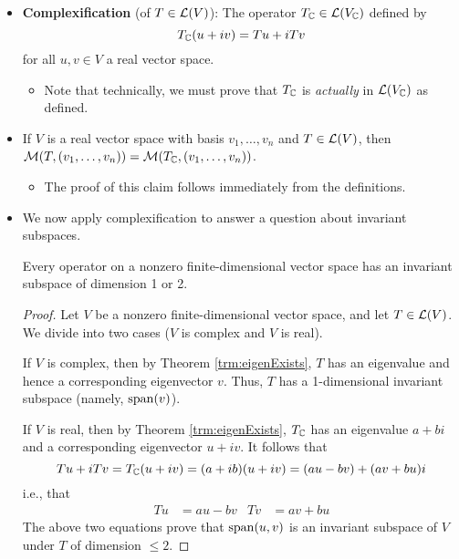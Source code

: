 \documentclass[../main.tex]{subfiles}
\begin{document}
\begin{itemize}
    \item \textbf{Complexification} (of $T\in\mathcal{L}(V)$): The operator $T_{\mathbb{C}}\in\mathcal{L}(V_{\mathbb{C}})$ defined by
    \begin{equation*}
        T_{\mathbb{C}}(u+iv) = Tu+iTv
    \end{equation*}
    for all $u,v\in V$ a real vector space.
    \begin{itemize}
        \item Note that technically, we must prove that $T_{\mathbb{C}}$ is \emph{actually} in $\mathcal{L}(V_{\mathbb{C}})$ as defined.
    \end{itemize}
    \item If $V$ is a real vector space with basis $v_1,\dots,v_n$ and $T\in\mathcal{L}(V)$, then $\mathcal{M}(T,(v_1,\dots,v_n))=\mathcal{M}(T_{\mathbb{C}},(v_1,\dots,v_n))$.
    \begin{itemize}
        \item The proof of this claim follows immediately from the definitions.
    \end{itemize}
    \item We now apply complexification to answer a question about invariant subspaces.
    \begin{theorem}
        Every operator on a nonzero finite-dimensional vector space has an invariant subspace of dimension 1 or 2.
        \begin{proof}
            Let $V$ be a nonzero finite-dimensional vector space, and let $T\in\mathcal{L}(V)$. We divide into two cases ($V$ is complex and $V$ is real).\par
            If $V$ is complex, then by Theorem \ref{trm:eigenExists}, $T$ has an eigenvalue and hence a corresponding eigenvector $v$. Thus, $T$ has a 1-dimensional invariant subspace (namely, $\operatorname{span}(v)$).\par
            If $V$ is real, then by Theorem \ref{trm:eigenExists}, $T_{\mathbb{C}}$ has an eigenvalue $a+bi$ and a corresponding eigenvector $u+iv$. It follows that
            \begin{equation*}
                Tu+iTv = T_{\mathbb{C}}(u+iv) = (a+ib)(u+iv) = (au-bv)+(av+bu)i
            \end{equation*}
            i.e., that
            \begin{align*}
                Tu &= au-bv&
                Tv &= av+bu
            \end{align*}
            The above two equations prove that $\operatorname{span}(u,v)$ is an invariant subspace of $V$ under $T$ of dimension $\leq 2$.
        \end{proof}
    \end{theorem}

\end{itemize}
\end{document}

